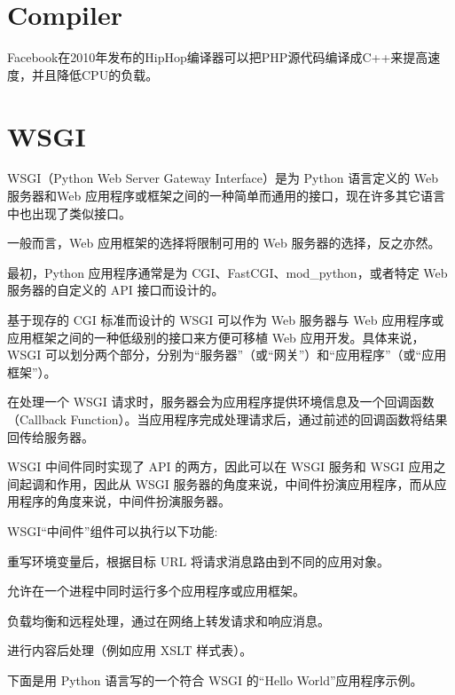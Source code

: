 \section{Compiler}



Facebook在2010年发布的HipHop编译器可以把PHP源代码编译成C++来提高速度，并且降低CPU的负载。








\section{WSGI}

WSGI（Python Web Server Gateway Interface）是为 Python 语言定义的 Web 服务器和Web 应用程序或框架之间的一种简单而通用的接口，现在许多其它语言中也出现了类似接口。

一般而言，Web 应用框架的选择将限制可用的 Web 服务器的选择，反之亦然。

最初，Python 应用程序通常是为 CGI、FastCGI、mod\_python，或者特定 Web 服务器的自定义的 API 接口而设计的。

基于现存的 CGI 标准而设计的 WSGI 可以作为 Web 服务器与 Web 应用程序或应用框架之间的一种低级别的接口来方便可移植 Web 应用开发。具体来说，WSGI 可以划分两个部分，分别为“服务器”（或“网关”）和“应用程序”（或“应用框架”）。

在处理一个 WSGI 请求时，服务器会为应用程序提供环境信息及一个回调函数（Callback Function）。当应用程序完成处理请求后，通过前述的回调函数将结果回传给服务器。

WSGI 中间件同时实现了 API 的两方，因此可以在 WSGI 服务和 WSGI 应用之间起调和作用，因此从 WSGI 服务器的角度来说，中间件扮演应用程序，而从应用程序的角度来说，中间件扮演服务器。

WSGI“中间件”组件可以执行以下功能:

\begin{compactitem}
\item 重写环境变量后，根据目标 URL 将请求消息路由到不同的应用对象。
\item 允许在一个进程中同时运行多个应用程序或应用框架。
\item 负载均衡和远程处理，通过在网络上转发请求和响应消息。
\item 进行内容后处理（例如应用 XSLT 样式表）。
\end{compactitem}

下面是用 Python 语言写的一个符合 WSGI 的“Hello World”应用程序示例。



